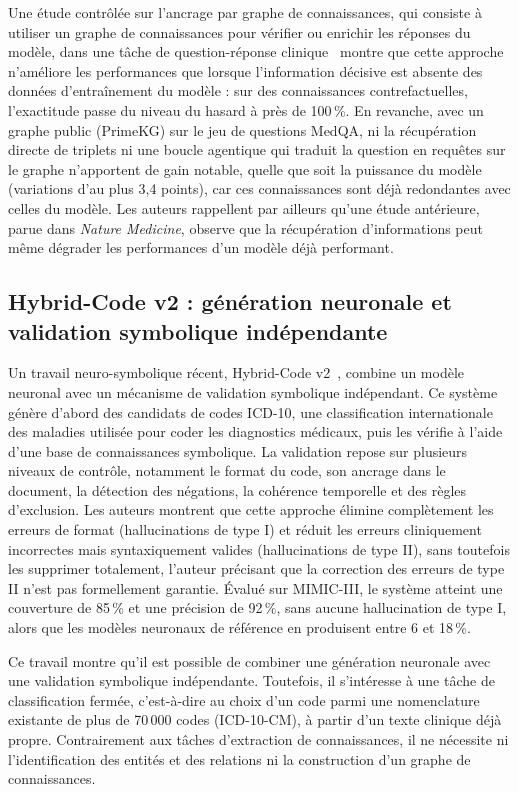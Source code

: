 Une étude contrôlée sur l'ancrage par graphe de connaissances, qui consiste à utiliser un graphe de connaissances pour vérifier ou enrichir les réponses du modèle, dans une tâche de question-réponse clinique~\cite{mandarapu2026knowledge} montre que cette approche n'améliore les performances que lorsque l'information décisive est absente des données d'entraînement du modèle : sur des connaissances contrefactuelles, l'exactitude passe du niveau du hasard à près de 100\,\%. En revanche, avec un graphe public (PrimeKG) sur le jeu de questions MedQA, ni la récupération directe de triplets ni une boucle agentique qui traduit la question en requêtes sur le graphe n'apportent de gain notable, quelle que soit la puissance du modèle (variations d'au plus 3,4 points), car ces connaissances sont déjà redondantes avec celles du modèle. Les auteurs rappellent par ailleurs qu'une étude antérieure, parue dans \textit{Nature Medicine}, observe que la récupération d'informations peut même dégrader les performances d'un modèle déjà performant.

\subsection{Hybrid-Code v2 : génération neuronale et validation symbolique indépendante}

Un travail neuro-symbolique récent, Hybrid-Code v2~\cite{hybrid2512v2}, combine un modèle neuronal avec un mécanisme de validation symbolique indépendant. Ce système génère d'abord des candidats de codes ICD-10, une classification internationale des maladies utilisée pour coder les diagnostics médicaux, puis les vérifie à l'aide d'une base de connaissances symbolique. La validation repose sur plusieurs niveaux de contrôle, notamment le format du code, son ancrage dans le document, la détection des négations, la cohérence temporelle et des règles d'exclusion. Les auteurs montrent que cette approche élimine complètement les erreurs de format (hallucinations de type I) et réduit les erreurs cliniquement incorrectes mais syntaxiquement valides (hallucinations de type II), sans toutefois les supprimer totalement, l'auteur précisant que la correction des erreurs de type II n'est pas formellement garantie. Évalué sur MIMIC-III, le système atteint une couverture de 85\,\% et une précision de 92\,\%, sans aucune hallucination de type I, alors que les modèles neuronaux de référence en produisent entre 6 et 18\,\%.

Ce travail montre qu'il est possible de combiner une génération neuronale avec une validation symbolique indépendante. Toutefois, il s'intéresse à une tâche de classification fermée, c'est-à-dire au choix d'un code parmi une nomenclature existante de plus de 70\,000 codes (ICD-10-CM), à partir d'un texte clinique déjà propre. Contrairement aux tâches d'extraction de connaissances, il ne nécessite ni l'identification des entités et des relations ni la construction d'un graphe de connaissances.

